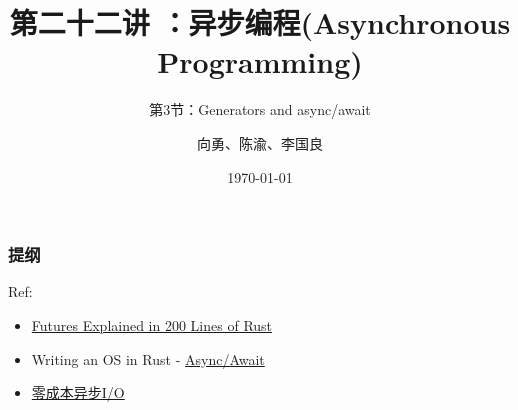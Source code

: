 


\title[第22讲]{第二十二讲 ：异步编程(Asynchronous Programming)}  %
\subtitle{第3节：Generators and async/await}
\author{向勇、陈渝、李国良} %
\date{\today} %



\begin{frame}
\titlepage %
\end{frame}

\begin{frame}
\frametitle{提纲} %
\tableofcontents %
Ref:
    \begin{itemize}
        \item \href{https://cfsamson.github.io/books-futures-explained/}{Futures Explained in 200 Lines of Rust}
        \item Writing an OS in Rust - \href{https://os.phil-opp.com/async-await/}{Async/Await}
        \item \href{https://zhuanlan.zhihu.com/p/97574385}{零成本异步I/O}
    \end{itemize}

\end{frame}
% 
% 
